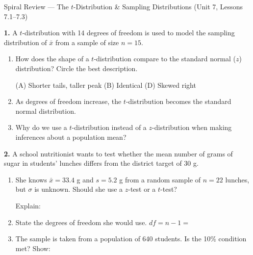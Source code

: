 \documentclass[10pt]{article}
\begin{document}
\namedateperiod

\vspace{0.15in}

\begin{notesbox}{Spiral Review --- The $t$-Distribution \& Sampling Distributions (Unit 7, Lessons 7.1--7.3)}

\textbf{1.} A $t$-distribution with 14 degrees of freedom is used to model the sampling
distribution of $\bar x$ from a sample of size $n = 15$.

\begin{enumerate}[label=\alph*.]
  \item How does the shape of a $t$-distribution compare to the standard normal ($z$) distribution?
        Circle the best description.

        \quad (A) Shorter tails, taller peak \quad (B) Identical \quad {} \quad (D) Skewed right

  \item As degrees of freedom increase, the $t$-distribution becomes 
        the standard normal distribution.

  \item Why do we use a $t$-distribution instead of a $z$-distribution when making inferences
        about a population mean? 
\end{enumerate}

\vspace{0.12in}
\textbf{2.} A school nutritionist wants to test whether the mean number of grams of sugar in
students' lunches differs from the district target of 30 g.

\begin{enumerate}[label=\alph*.]
  \item She knows $\bar x = 33.4$ g and $s = 5.2$ g from a random sample of $n = 22$ lunches,
        but $\sigma$ is unknown. Should she use a $z$-test or a $t$-test? 

        Explain: 

  \item State the degrees of freedom she would use. \quad $df = n - 1 = $ 

  \item The sample is taken from a population of 640 students.
        Is the 10\% condition met?  Show: 
\end{enumerate}

\end{notesbox}
\end{document}
